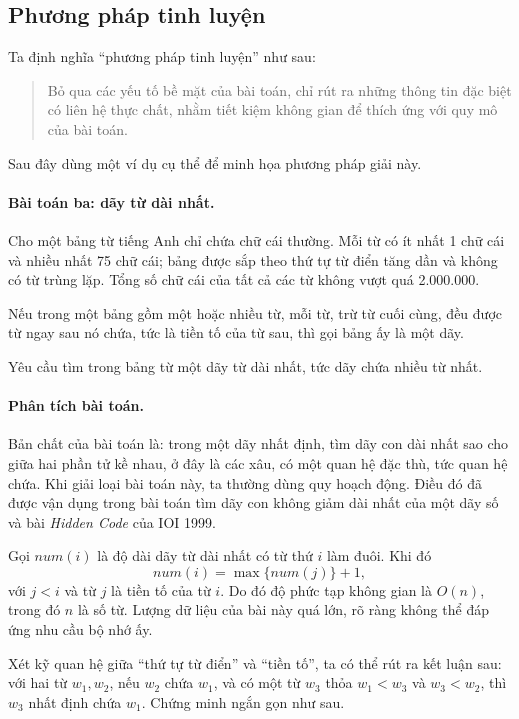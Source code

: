 \documentclass[11pt]{article}
\begin{document}
\subsection{Phương pháp tinh luyện}

Ta định nghĩa ``phương pháp tinh luyện'' như sau:

\begin{quote}
Bỏ qua các yếu tố bề mặt của bài toán, chỉ rút ra những thông tin đặc biệt có
liên hệ thực chất, nhằm tiết kiệm không gian để thích ứng với quy mô của bài
toán.
\end{quote}

Sau đây dùng một ví dụ cụ thể để minh họa phương pháp giải này.

\paragraph{Bài toán ba: dãy từ dài nhất.}
Cho một bảng từ tiếng Anh chỉ chứa chữ cái thường. Mỗi từ có ít nhất 1 chữ
cái và nhiều nhất 75 chữ cái; bảng được sắp theo thứ tự từ điển tăng dần và
không có từ trùng lặp. Tổng số chữ cái của tất cả các từ không vượt quá
2.000.000.

Nếu trong một bảng gồm một hoặc nhiều từ, mỗi từ, trừ từ cuối cùng, đều được
từ ngay sau nó chứa, tức là tiền tố của từ sau, thì gọi bảng ấy là một dãy.

Yêu cầu tìm trong bảng từ một dãy từ dài nhất, tức dãy chứa nhiều từ nhất.

\paragraph{Phân tích bài toán.}
Bản chất của bài toán là: trong một dãy nhất định, tìm dãy con dài nhất sao
cho giữa hai phần tử kề nhau, ở đây là các xâu, có một quan hệ đặc thù, tức
quan hệ chứa. Khi giải loại bài toán này, ta thường dùng quy hoạch động. Điều
đó đã được vận dụng trong bài toán tìm dãy con không giảm dài nhất của một
dãy số và bài \textit{Hidden Code} của IOI 1999.

Gọi \(num(i)\) là độ dài dãy từ dài nhất có từ thứ \(i\) làm đuôi. Khi đó
\[
num(i)=\max\{num(j)\}+1,
\]
với \(j<i\) và từ \(j\) là tiền tố của từ \(i\). Do đó độ phức tạp không gian
là \(O(n)\), trong đó \(n\) là số từ. Lượng dữ liệu của bài này quá lớn, rõ
ràng không thể đáp ứng nhu cầu bộ nhớ ấy.

Xét kỹ quan hệ giữa ``thứ tự từ điển'' và ``tiền tố'', ta có thể rút ra kết
luận sau: với hai từ \(w_1,w_2\), nếu \(w_2\) chứa \(w_1\), và có một từ
\(w_3\) thỏa \(w_1<w_3\) và \(w_3<w_2\), thì \(w_3\) nhất định chứa \(w_1\).
Chứng minh ngắn gọn như sau.
\end{document}
